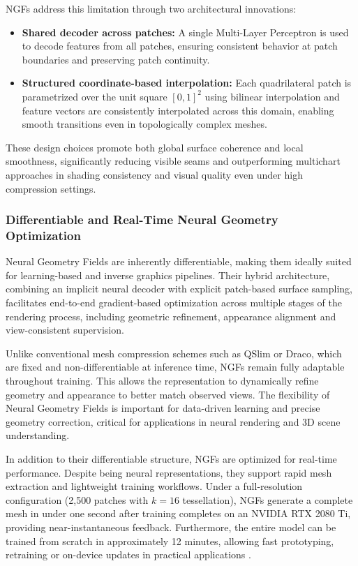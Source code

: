 NGFs address this limitation through two architectural innovations:
\begin{itemize}
    \item \textbf{Shared decoder across patches:} A single Multi-Layer Perceptron is used to decode features from all patches, ensuring consistent behavior at patch boundaries and preserving patch continuity.
    \item \textbf{Structured coordinate-based interpolation:} Each quadrilateral patch is parametrized over the unit square $[0,1]^2$ using bilinear interpolation and feature vectors are consistently interpolated across this domain, enabling smooth transitions even in topologically complex meshes.
\end{itemize}

These design choices promote both global surface coherence and local smoothness, significantly reducing visible seams and outperforming multichart approaches in shading consistency and visual quality even under high compression settings.

\subsubsection{Differentiable and Real-Time Neural Geometry Optimization}

Neural Geometry Fields are inherently differentiable, making them ideally suited for learning-based and inverse graphics pipelines. 
Their hybrid architecture, combining an implicit neural decoder with explicit patch-based surface sampling, facilitates end-to-end gradient-based optimization across multiple stages of the rendering process, including geometric refinement, appearance alignment and view-consistent supervision. 

Unlike conventional mesh compression schemes such as QSlim or Draco, which are fixed and non-differentiable at inference time, NGFs remain fully adaptable throughout training. 
This allows the representation to dynamically refine geometry and appearance to better match observed views. 
The flexibility of Neural Geometry Fields is important for data-driven learning and precise geometry correction, critical for applications in neural rendering and 3D scene understanding. 

In addition to their differentiable structure, NGFs are optimized for real-time performance. 
Despite being neural representations, they support rapid mesh extraction and lightweight training workflows. 
Under a full-resolution configuration (2,500 patches with $k=16$ tessellation), NGFs generate a complete mesh in under one second after training completes on an NVIDIA RTX 2080 Ti, providing near-instantaneous feedback. 
Furthermore, the entire model can be trained from scratch in approximately 12 minutes, allowing fast prototyping, retraining or on-device updates in practical applications \cite{sivaram2024}. 

